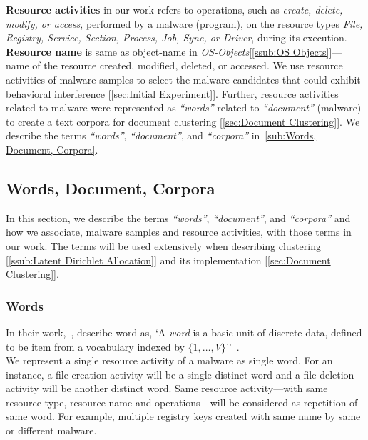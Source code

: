 \textbf{Resource activities} in our work refers to operations, such as \emph{create, delete, modify, or access}, performed by a malware (program), on the resource types \emph{File, Registry, Service, Section, Process, Job, Sync, or Driver}, during its execution.
\textbf{Resource name} is same as object-name in \emph{OS-Objects}[\autoref{ssub:OS Objects}]---name of the resource created, modified, deleted, or accessed.
We use resource activities of malware samples to select the malware candidates that could exhibit behavioral interference [\autoref{sec:Initial Experiment}].
Further, resource activities related to malware were represented as \emph{``words''} related to \emph{``document''} (malware) to create a text corpora for document clustering [\autoref{sec:Document Clustering}].
We describe the terms \emph{``words''}, \emph{``document''}, and \emph{``corpora''} in~\autoref{sub:Words, Document, Corpora}.
\subsection{Words, Document, Corpora}
\label{sub:Words, Document, Corpora}
In this section, we describe the terms \emph{``words''}, \emph{``document''}, and \emph{``corpora''} and how we associate, malware samples and resource activities, with those terms in our work.
The terms will be used extensively when describing clustering [\autoref{ssub:Latent Dirichlet Allocation}] and its implementation [\autoref{sec:Document Clustering}].
\subsubsection{Words}
\label{ssub:Words}
In their work,~\citeauthor{Blei}, describe word as, `A \emph{word} is a basic unit of discrete data, defined to be item from a vocabulary indexed by $\{1,\ldots,V\}$''~\cite[]{Blei}.\\
We represent a single resource activity of a malware as single word.
For an instance, a file creation activity will be a single distinct word and a file deletion activity will be another distinct word.
Same resource activity---with same resource type, resource name and operations---will be considered as repetition of same word.
For example, multiple registry keys created with same name by same or different malware.
